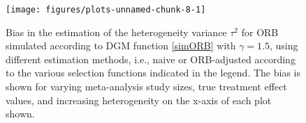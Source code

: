 \documentclass[twocolumn]{article}\usepackage[]{graphicx}\usepackage[]{xcolor}
\begin{document}




\begin{figure}[!hbt]
\centering
\caption{Bias in the estimation of the heterogeneity variance $\tau^2$ for ORB simulated according to DGM function \eqref{simORB} with $\gamma=1.5$, using different estimation methods, i.e., naive or ORB-adjusted according to the various selection functions indicated in the legend. The bias is shown for varying meta-analysis study sizes, true treatment effect values, and increasing heterogeneity on the x-axis of each plot shown.\\[0.5em]}


{\centering \texttt{[image: figures/plots-unnamed-chunk-8-1]} 

}



\label{biastau1}
\end{figure}



\end{document}

